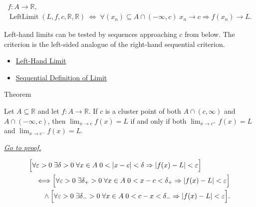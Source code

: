 \begin{remark*}
\[
\begin{aligned}
  f\colon A\to\mathbb{R},\\
  \operatorname{LeftLimit}(L,f,c,\mathbb{R},\mathbb{R})
  \;\Longleftrightarrow\;
  \forall (x_n)\subseteq A\cap(-\infty,c)\;
  x_n\to c\Rightarrow f(x_n)\to L.
\end{aligned}
\]
\end{remark*}

\begin{remark*}[Interpretation]
Left-hand limits can be tested by sequences approaching $c$ from below.
The criterion is the left-sided analogue of the right-hand sequential
criterion.
\end{remark*}

\begin{dependencies}
\begin{itemize}
  \item \hyperref[def:left-hand-limit]{Left-Hand Limit}
  \item \hyperref[def:limit-function-sequential]{Sequential Definition of Limit}
\end{itemize}
\end{dependencies}


\begin{theorembox}{Theorem}
\begin{theorem}
\label{thm:two-sided-limit-iff-matching-one-sided-limits}
Let $A\subseteq\mathbb{R}$ and let $f:A\to\mathbb{R}$. If $c$ is a
cluster point of both $A\cap(c,\infty)$ and $A\cap(-\infty,c)$, then
$\lim_{x\to c}f(x)=L$ if and only if both $\lim_{x\to c^+}f(x)=L$ and
$\lim_{x\to c^-}f(x)=L$.

\smallskip\noindent
\hyperref[prf:two-sided-limit-iff-matching-one-sided-limits]{\textit{Go to proof.}}
\end{theorem}
\end{theorembox}

\begin{remark*}
\[
\begin{aligned}
&\Bigl[\forall\varepsilon>0\;\exists\delta>0\;\forall x\in A\;
  0<|x-c|<\delta\Rightarrow |f(x)-L|<\varepsilon\Bigr] \\
&\quad\Longleftrightarrow
\Bigl[\forall\varepsilon>0\;\exists\delta_+>0\;\forall x\in A\;
  0<x-c<\delta_+\Rightarrow |f(x)-L|<\varepsilon\Bigr] \\
&\qquad\wedge
\Bigl[\forall\varepsilon>0\;\exists\delta_->0\;\forall x\in A\;
  0<c-x<\delta_-\Rightarrow |f(x)-L|<\varepsilon\Bigr].
\end{aligned}
\]
\end{remark*}

